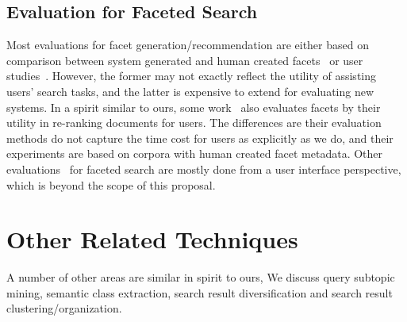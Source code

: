 \subsection{Evaluation for Faceted Search}
Most evaluations for facet generation/recommendation are either based on comparison between system generated and human created facets~\cite{dakka2008automatic,dou2011finding} or user studies~\cite{dash2008dynamic,li2010facetedpedia,stoica2007automating}. However, the former may not exactly reflect the utility of assisting users' search tasks, and the latter is expensive to extend for evaluating new systems. In a spirit similar to ours, some work~\cite{schuth2011evaluation,zhang2010interactive,koren2008personalized} also evaluates facets by their utility in re-ranking documents for users. The differences are their evaluation methods do not capture the time cost for users as explicitly as we do, and their experiments are based on corpora with human created facet metadata. Other evaluations~\cite{burke1996knowledge,english2002hierarchical,hearst2006design,hearst2008uis,kules2009exploratory} for faceted search are mostly done from a user interface perspective, which is beyond the scope of 
this proposal.

\section{Other Related Techniques}
\label{sec:bg-others}
A number of other areas are similar in spirit to ours, We discuss query subtopic mining, semantic class extraction, search result diversification and search result clustering/organization.
